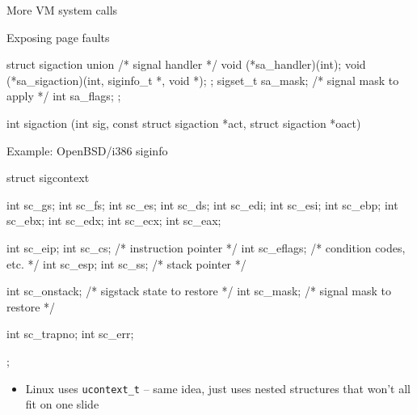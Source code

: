 \documentclass[11pt,aspectratio=169]{beamer}
\begin{document}
\begin{slide}{More VM system calls}
\end{slide}

\begin{slide}{Exposing page faults}
\begin{ccode}
  struct sigaction {
    union {               /* signal handler */
      void (*sa_handler)(int);
      void (*sa_sigaction)(int, siginfo_t *, void *);
    };
    sigset_t sa_mask;     /* signal mask to apply */
    int sa_flags;
  };

  int sigaction (int sig, const struct sigaction *act,
                 struct sigaction *oact)
\end{ccode}
\end{slide}

\begin{slide}{Example:  OpenBSD/i386 siginfo}
\begin{ccode}
struct  sigcontext {
  int sc_gs; int sc_fs; int sc_es; int sc_ds;
  int sc_edi; int sc_esi; int sc_ebp; int sc_ebx; 
  int sc_edx; int sc_ecx; int sc_eax;

  int sc_eip; int sc_cs;    /* instruction pointer */
  int sc_eflags;            /* condition codes, etc. */
  int sc_esp; int sc_ss;    /* stack pointer */

  int sc_onstack;           /* sigstack state to restore */
  int sc_mask;              /* signal mask to restore */

  int sc_trapno;
  int sc_err;
};
\end{ccode}
\begin{itemize}
  \item Linux uses \texttt{ucontext\_t} -- same idea, just uses nested
    structures that won't all fit on one slide
\end{itemize}
\end{slide}
\end{document}
